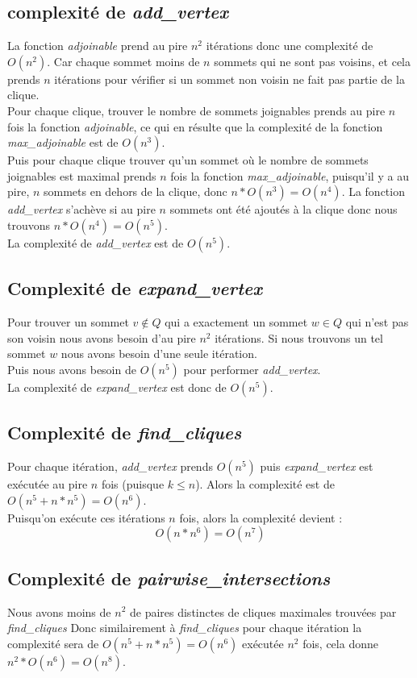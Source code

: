 \documentclass{article}
\begin{document}
\subsection{complexité de \textit{add\_vertex}}
La fonction \textit{adjoinable} prend au pire $n^2$ itérations donc une complexité de $O(n^2)$.
Car chaque sommet moins de $n$ sommets qui ne sont pas voisins, et cela prends $n$ itérations pour
vérifier si un sommet non voisin ne fait pas partie de la clique.\\
Pour chaque clique, trouver le nombre de sommets joignables prends au pire $n$ fois la fonction
\textit{adjoinable}, ce qui en résulte que la complexité de la fonction \textit{max\_adjoinable} est
de $O(n^3)$.\\
Puis pour chaque clique trouver qu'un sommet où le nombre de sommets joignables est maximal prends
$n$ fois la fonction \textit{max\_adjoinable}, puisqu'il y a au pire, $n$ sommets en dehors de la
clique, donc $n*O(n^3)=O(n^4)$. La fonction \textit{add\_vertex} s'achève si au pire $n$ sommets
ont été ajoutés à la clique donc nous trouvons $n*O(n^4)=O(n^5)$.\\
La complexité de \textit{add\_vertex} est de $O(n^5)$.
\subsection{Complexité de \textit{expand\_vertex}}
Pour trouver un sommet $v \notin Q$ qui a exactement un sommet $w \in Q$ qui n'est pas son voisin
nous avons besoin d'au pire $n^2$ itérations. Si nous trouvons un tel sommet $w$ nous avons besoin
d'une seule itération.\\ Puis nous avons besoin de $O(n^5)$ pour performer \textit{add\_vertex}.\\
La complexité de \textit{expand\_vertex} est donc de $O(n^5)$.
\subsection{Complexité de \textit{find\_cliques}}
Pour chaque itération, \textit{add\_vertex} prends $O(n^5)$ puis \textit{expand\_vertex} est exécutée
au pire $n$ fois (puisque $k \leq n$). Alors la complexité est de $O(n^5+n*n^5)=O(n^6)$. \\
Puisqu'on exécute ces itérations $n$ fois, alors la complexité devient :
\begin{displaymath}
  O(n*n^6)=O(n^7)
\end{displaymath}
\subsection{Complexité de \textit{pairwise\_intersections}}
Nous avons moins de $n^2$ de paires distinctes de cliques maximales trouvées par \textit{find\_cliques}
Donc similairement à \textit{find\_cliques} pour chaque itération la complexité sera de $O(n^5+n*n^5)=O(n^6)$
exécutée $n^2$ fois, cela donne $n^2*O(n^6)=O(n^8)$.
\end{document}

